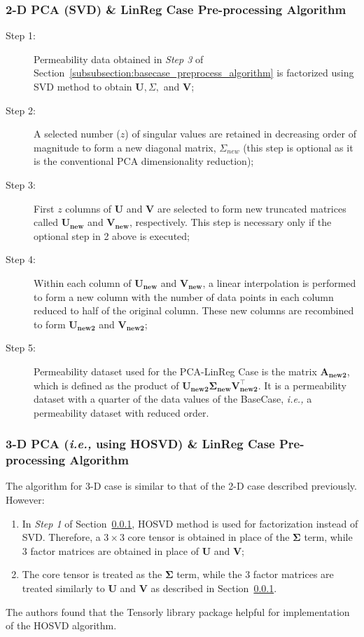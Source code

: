 \documentclass[preprint,12pt]{elsarticle}
\newcommand{\ie}{{\it i.e., }}
\begin{document}
\subsubsection{2-D PCA (SVD) \& LinReg Case Pre-processing Algorithm}\label{subsubsection:svdcase_preprocess_algorithm}
\begin{description}
  \item[Step 1:] Permeability data obtained in {\it Step 3}  of Section~\ref{subsubsection:basecase_preprocess_algorithm} is factorized using SVD method to obtain $\mathbf{U}, \Sigma,$ and $\mathbf{V}$;
  \item[Step 2:] A selected number ($z$) of singular values are retained in decreasing order of magnitude to form a new diagonal matrix, $\Sigma_{new}$ (this step is optional as it is the conventional PCA dimensionality reduction);
  \item[Step 3:] First $z$ columns of $\mathbf{U}$ and $\mathbf{V}$ are selected to form new truncated matrices called $\mathbf{U_{new}}$ and $\mathbf{V_{new}}$, respectively. This step is necessary only if the optional step in 2 above is executed;
  \item[Step 4:] Within each column of $\mathbf{U_{new}}$ and $\mathbf{V_{new}}$, a linear interpolation is performed to form a new column with the number of data points in each column reduced to half of the original column. These new columns are recombined to form $\mathbf{U_{new2}}$ and $\mathbf{V_{new2}}$;
  \item[Step 5:] Permeability dataset used for the PCA-LinReg Case is the matrix $\mathbf{A_{new2}}$, which is defined as the product of $\mathbf{U_{new2}} \mathbf{\Sigma_{new}} \mathbf{V_{new2}^{\intercal}}$. It is a permeability dataset with a quarter of the data values of the BaseCase, \ie a permeability dataset with reduced order.  
\end{description}


\subsubsection{3-D PCA (\ie{using HOSVD}) \& LinReg Case Pre-processing Algorithm}\label{subsubsection:hosvdcase_preprocess_algorithm}
The algorithm for 3-D case is similar to that of the 2-D case described previously. However:
\begin{enumerate}[1.]
  \item In {\it Step 1} of Section~\ref{subsubsection:svdcase_preprocess_algorithm}, HOSVD method is used for factorization instead of SVD. Therefore, a $3 \times 3$ core tensor is obtained in place of the $\mathbf{\Sigma}$ term, while 3 factor matrices are obtained in place of $\mathbf{U}$ and $\mathbf{V}$;
  \item The core tensor is treated as the $\mathbf{\Sigma}$ term, while the 3 factor matrices are treated similarly to $\mathbf{U}$ and $\mathbf{V}$ as described in Section~\ref{subsubsection:svdcase_preprocess_algorithm}.
\end{enumerate}
The authors found that the Tensorly library package \cite{Tensorly_2018} helpful for implementation of the HOSVD algorithm.
\end{document}
